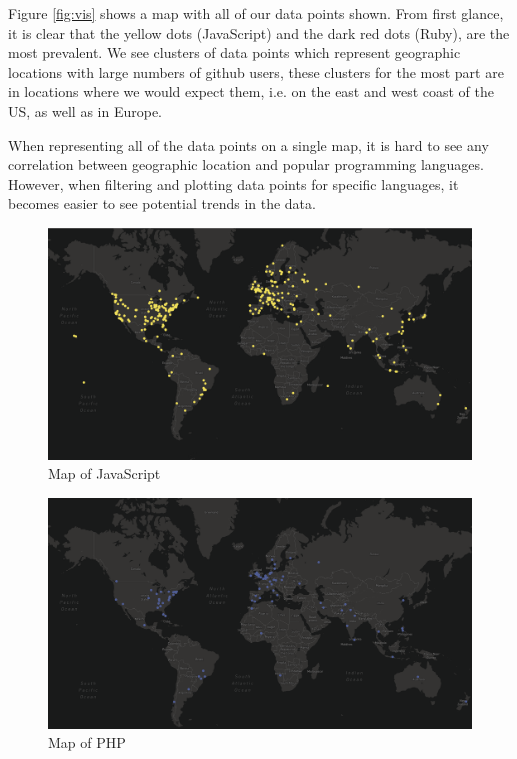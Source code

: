 \documentclass[11pt]{article}
\begin{document}
Figure \ref{fig:vis} shows a map with all of our data points shown. From first glance, it is clear that the yellow dots (JavaScript) and the dark red dots (Ruby), are the most prevalent. We see clusters of data points which represent geographic locations with large numbers of github users, these clusters for the most part are in locations where we would expect them, i.e. on the east and west coast of the US, as well as in Europe. 

When representing all of the data points on a single map, it is hard to see any correlation between geographic location and popular programming languages. However, when filtering and plotting data points for specific languages, it becomes easier to see potential trends in the data.

\begin{figure}[H]
\centering
\includegraphics[scale=0.25]{JavaScript.png}
\caption{Map of JavaScript}
\label{fig:js}
\end{figure}

\begin{figure}[H]
\centering
\includegraphics[scale=0.25]{PHP.png}
\caption{Map of PHP}
\label{fig:php}
\end{figure}
\end{document}

